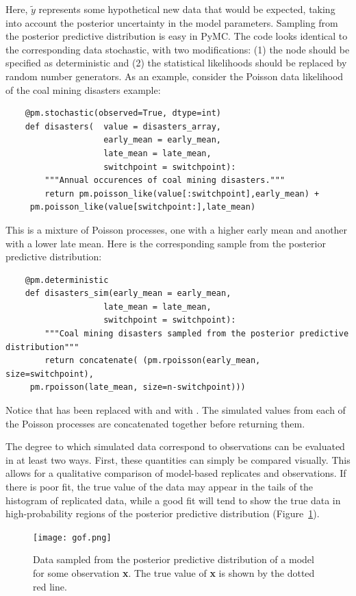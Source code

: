 Here, $\tilde{y}$ represents some hypothetical new data that would be expected, taking into account the posterior uncertainty in the model parameters. Sampling from the posterior predictive distribution is easy in PyMC. The code looks identical to the corresponding data stochastic, with two modifications: (1) the node should be specified as deterministic and (2) the statistical likelihoods should be replaced by random number generators. As an example, consider the Poisson data likelihood of the coal mining disasters example:
\begin{verbatim}
	@pm.stochastic(observed=True, dtype=int)
	def disasters(  value = disasters_array,
	                early_mean = early_mean,
	                late_mean = late_mean,
	                switchpoint = switchpoint):
	    """Annual occurences of coal mining disasters."""
	    return pm.poisson_like(value[:switchpoint],early_mean) +
	 pm.poisson_like(value[switchpoint:],late_mean)
\end{verbatim}
This is a mixture of Poisson processes, one with a higher early mean and another with a lower late mean. Here is the corresponding sample from the posterior predictive distribution:
\begin{verbatim}
	@pm.deterministic
	def disasters_sim(early_mean = early_mean,
	                late_mean = late_mean,
	                switchpoint = switchpoint):
	    """Coal mining disasters sampled from the posterior predictive distribution"""
	    return concatenate( (pm.rpoisson(early_mean, size=switchpoint),
	 pm.rpoisson(late_mean, size=n-switchpoint)))
\end{verbatim}
Notice that  has been replaced with  and  with . The simulated values from each of the Poisson processes are concatenated together before returning them.

The degree to which simulated data correspond to observations can be evaluated in at least two ways. First, these quantities can simply be compared visually. This allows for a qualitative comparison of model-based replicates and observations. If there is poor fit, the true value of the data may appear in the tails of the histogram of replicated data, while a good fit will tend to show the true data in high-probability regions of the posterior predictive distribution (Figure~\ref{fig:gof}).

\begin{figure}[h]
        \begin{center}
        \texttt{[image: gof.png]}
    \end{center}
    \caption{Data sampled from the posterior predictive distribution of a model for some observation \textbf{x}. The true value of \textbf{x} is shown by the dotted red line.}
    \label{fig:gof}
\end{figure}

